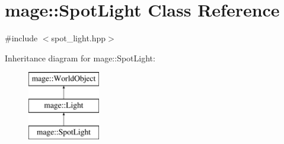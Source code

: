 \hypertarget{classmage_1_1_spot_light}{}\section{mage\+:\+:Spot\+Light Class Reference}
\label{classmage_1_1_spot_light}


{\ttfamily \#include $<$spot\+\_\+light.\+hpp$>$}

Inheritance diagram for mage\+:\+:Spot\+Light\+:\begin{figure}[H]
\begin{center}
\leavevmode
\includegraphics[height=3.000000cm]{classmage_1_1_spot_light}
\end{center}
\end{figure}
